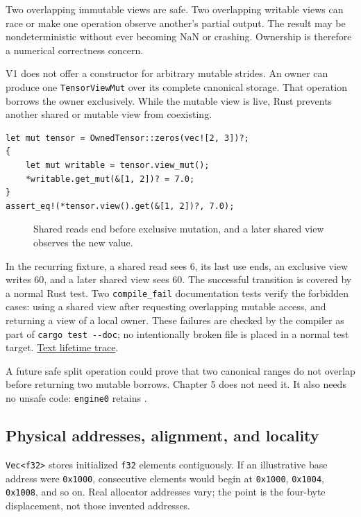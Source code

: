 \documentclass[
  10pt,
]{article}
\begin{document}
Two overlapping immutable views are safe. Two overlapping writable views
can race or make one operation observe another's partial output. The
result may be nondeterministic without ever becoming NaN or crashing.
Ownership is therefore a numerical correctness concern.

V1 does not offer a constructor for arbitrary mutable strides. An owner
can produce one \texttt{TensorViewMut} over its complete canonical
storage. That operation borrows the owner exclusively. While the mutable
view is live, Rust prevents another shared or mutable view from
coexisting.

\begin{verbatim}
let mut tensor = OwnedTensor::zeros(vec![2, 3])?;
{
    let mut writable = tensor.view_mut();
    *writable.get_mut(&[1, 2])? = 7.0;
}
assert_eq!(*tensor.view().get(&[1, 2])?, 7.0);
\end{verbatim}

\begin{figure}[H]\centering\resizebox{\linewidth}{!}{}\caption{Shared reads end before exclusive mutation, and a later shared view observes the new value.}\end{figure}

In the recurring fixture, a shared read sees 6, its last use ends, an
exclusive view writes 60, and a later shared view sees 60. The
successful transition is covered by a normal Rust test. Two
\texttt{compile\_fail} documentation tests verify the forbidden cases:
using a shared view after requesting overlapping mutable access, and
returning a view of a local owner. These failures are checked by the
compiler as part of \texttt{cargo\ test\ -\/-doc}; no intentionally
broken file is placed in a normal test target.
\href{https://github.com/hermonai/inside-the-llm-engine/blob/astra-visual-rewrite/figures/generated/tensor-lifetime.txt}{Text
lifetime trace}.

A future safe split operation could prove that two canonical ranges do
not overlap before returning two mutable borrows. Chapter 5 does not
need it. It also needs no unsafe code: \texttt{engine0} retains
\texttt{}.

\subsection{Physical addresses, alignment, and
locality}\label{physical-addresses-alignment-and-locality}

\texttt{Vec\textless{}f32\textgreater{}} stores initialized \texttt{f32}
elements contiguously. If an illustrative base address were
\texttt{0x1000}, consecutive elements would begin at \texttt{0x1000},
\texttt{0x1004}, \texttt{0x1008}, and so on. Real allocator addresses
vary; the point is the four-byte displacement, not those invented
addresses.
\end{document}
